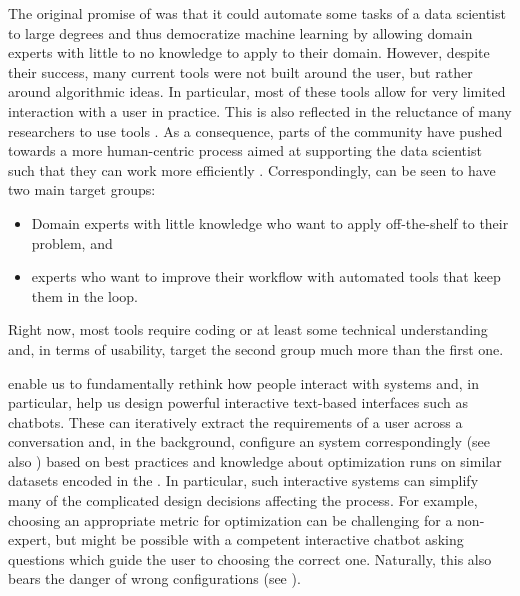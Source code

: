 The original promise of \AutoML was that it could automate some tasks of a data scientist to large degrees and thus democratize machine learning by allowing domain experts with little to no \ML knowledge to apply \ML to their domain. However, despite their success, many current \AutoML tools were not built around the user, but rather around algorithmic ideas. In particular, most of these tools allow for very limited interaction with a user in practice. This is also reflected in the reluctance of many researchers to use \AutoML tools \cite{blom-automl21a}. As a consequence, parts of the community have pushed towards a more human-centric \AutoML process aimed at supporting the data scientist such that they can work more efficiently \cite{lindauer-automlorg22,pfisterer-arxiv2019a}. Correspondingly, \AutoML can be seen to have two main target groups: 
\begin{itemize}[(i)]
    \item Domain experts with little \ML knowledge who want to apply off-the-shelf \ML to their problem, and
    \item \ML experts who want to improve their workflow with automated tools that keep them in the loop. 
\end{itemize}
%
Right now, most \AutoML tools require coding or at least some technical understanding and, in terms of usability, target the second group much more than the first one. 

\LLMs enable us to fundamentally rethink how people interact with \AutoML systems and, in particular, help us design powerful interactive text-based interfaces such as chatbots. 
These can iteratively extract the requirements of a user across a conversation and, in the background, configure an \AutoML system correspondingly (see also ) based on \ML best practices and knowledge about optimization runs on similar datasets encoded in the \LLM. In particular, such interactive systems can simplify many of the complicated design decisions affecting the \AutoML process. For example, choosing an appropriate metric for optimization can be challenging for a non-expert, but might be possible with a competent interactive chatbot asking questions which guide the user to choosing the correct one. Naturally, this also bears the danger of wrong \AutoML configurations (see ).

